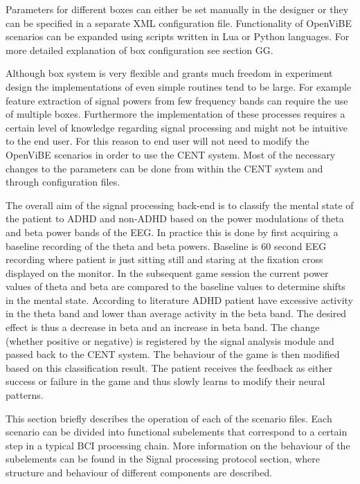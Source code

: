 Parameters for different boxes can either be set manually in the designer or they can be specified in a separate XML configuration file. Functionality of OpenViBE scenarios can be expanded using scripts written in Lua or Python languages. For more detailed explanation of box configuration see section GG.

Although box system is very flexible and grants much freedom in experiment design the implementations of even simple routines tend to be large. For example feature extraction of signal powers from few frequency bands can require the use of multiple boxes. Furthermore the implementation of these processes requires a certain level of knowledge regarding signal processing and might not be intuitive to the end user. For this reason to end user will not need to modify the OpenViBE scenarios in order to use the CENT system. Most of the necessary changes to the parameters can be done from within the CENT system and through configuration files.

The overall aim of the signal processing back-end is to classify the mental state of the patient to ADHD and non-ADHD based on the power modulations of theta and beta power bands of the EEG. In practice this is done by first acquiring a baseline recording of the theta and beta powers. Baseline is 60 second EEG recording where patient is just sitting still and staring at the fixation cross displayed on the monitor. In the subsequent game session the current power values of theta and beta are compared to the baseline values to determine shifts in the mental state. According to literature ADHD patient have excessive activity in the theta band and lower than average activity in the beta band. The desired effect is thus a decrease in beta and an increase in beta band. The change (whether positive or negative) is registered by the signal analysis module and passed back to the CENT system. The behaviour of the game is then modified based on this classification result. The patient receives the feedback as either success or failure in the game and thus slowly learns to modify their neural patterns.

This section briefly describes the operation of each of the scenario files. Each scenario can be divided into functional subelements that correspond to a certain step in a typical BCI processing chain. More information on the behaviour of the subelements can be found in the Signal processing protocol section, where structure and behaviour of different components are described.

